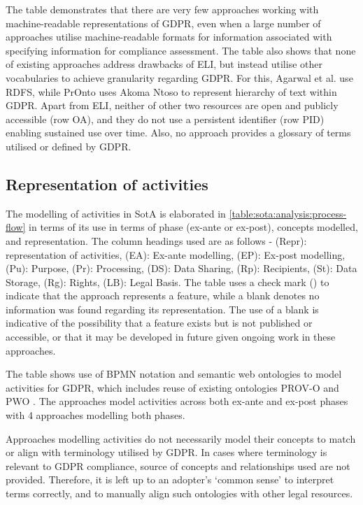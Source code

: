 The table demonstrates that there are very few approaches working with machine-readable representations of GDPR, even when a large number of approaches utilise machine-readable formats for information associated with specifying information for compliance assessment. The table also shows that none of existing approaches address drawbacks of ELI, but instead utilise other vocabularies to achieve granularity regarding GDPR. For this, Agarwal et al. \cite{agarwal_legislative_2018} use RDFS, while PrOnto uses Akoma Ntoso to represent hierarchy of text within GDPR.
Apart from ELI, neither of other two resources are open and publicly accessible (row OA), and they do not use a persistent identifier (row PID) enabling sustained use over time. Also, no approach provides a glossary of terms utilised or defined by GDPR.

\subsection{Representation of activities}\label{sota:analysis:process-flows}
The modelling of activities in SotA is elaborated in \autoref{table:sota:analysis:process-flow} in terms of its use in terms of phase (ex-ante or ex-post), concepts modelled, and representation. The column headings used are as follows - (Repr): representation of activities, (EA): Ex-ante modelling, (EP): Ex-post modelling, (Pu): Purpose, (Pr): Processing, (DS): Data Sharing, (Rp): Recipients, (St): Data Storage, (Rg): Rights, (LB): Legal Basis.
The table uses a check mark (\cmark) to indicate that the approach represents a feature, while a blank denotes no information was found regarding its representation. The use of a blank is indicative of the possibility that a feature exists but is not published or accessible, or that it may be developed in future given ongoing work in these approaches.

The table shows use of BPMN notation and semantic web ontologies to model activities for GDPR, which includes reuse of existing ontologies PROV-O \cite{lebo_prov-o_2013} and 
PWO \cite{gangemi_publishing_2017}.
The approaches model activities across both ex-ante and ex-post phases with 4 approaches modelling both phases.

Approaches modelling activities do not necessarily model their concepts to match or align with terminology utilised by GDPR. In cases where terminology is relevant to GDPR compliance, source of concepts and relationships used are not provided. Therefore, it is left up to an adopter's `common sense' to interpret terms correctly, and to manually align such ontologies with other legal resources.

